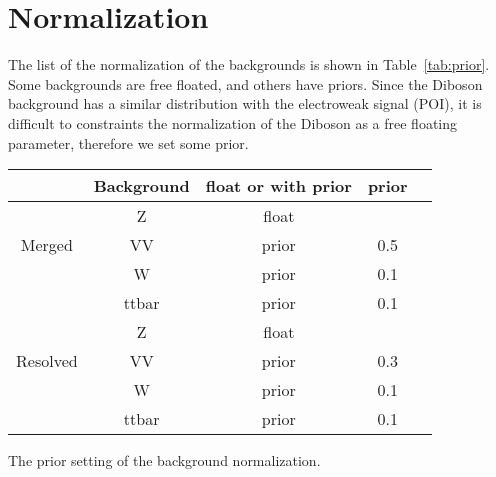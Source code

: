 \section{Normalization}
The list of the normalization of the backgrounds is shown in Table~\ref{tab:prior}.
Some backgrounds are free floated, and others have priors. Since the Diboson background has a similar distribution with the electroweak signal (POI), it is difficult to constraints the normalization of the Diboson as a free floating parameter, therefore we set some prior.

\begin{center}
\begin{tabular}{ |c|c|c|c|c| } 
\hline
 & Background & float or with prior & prior \\
\hline
\multirow{3}{4em}{Merged} & Z & float &       \\ 
& VV                          & prior &   0.5 \\ 
& W                           & prior &   0.1 \\ 
& ttbar                       & prior &   0.1 \\ 
\hline
\multirow{3}{4em}{Resolved} & Z & float &       \\ 
& VV                          & prior &   0.3 \\ 
& W                           & prior &   0.1 \\ 
& ttbar                       & prior &   0.1 \\ 
\hline
\end{tabular}
\caption{\label{tab:prior} The prior setting of the background normalization. }
\end{center}

